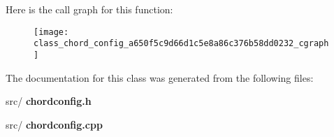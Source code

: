 Here is the call graph for this function\+:\nopagebreak
\begin{figure}[H]
\begin{center}
\leavevmode
\texttt{[image: class\_chord\_config\_a650f5c9d66d1c5e8a86c376b58dd0232\_cgraph]}
\end{center}
\end{figure}


The documentation for this class was generated from the following files\+:\begin{DoxyCompactItemize}
\item 
src/\textbf{ chordconfig.\+h}\item 
src/\textbf{ chordconfig.\+cpp}\end{DoxyCompactItemize}
